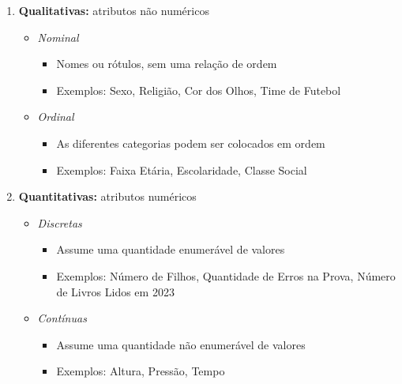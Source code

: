 \documentclass[
]{book}
\providecommand{\tightlist}{%
  \setlength{\itemsep}{0pt}\setlength{\parskip}{0pt}}
\begin{document}
\begin{enumerate}
\def\labelenumi{\arabic{enumi}.}
\tightlist
\item
  \textbf{Qualitativas:} atributos não numéricos

  \begin{itemize}
  \tightlist
  \item
    \emph{Nominal}

    \begin{itemize}
    \tightlist
    \item
      Nomes ou rótulos, sem uma relação de ordem\\
    \item
      Exemplos: Sexo, Religião, Cor dos Olhos, Time de Futebol\\
    \end{itemize}
  \item
    \emph{Ordinal}

    \begin{itemize}
    \tightlist
    \item
      As diferentes categorias podem ser colocados em ordem\\
    \item
      Exemplos: Faixa Etária, Escolaridade, Classe Social
    \end{itemize}
  \end{itemize}
\item
  \textbf{Quantitativas:} atributos numéricos

  \begin{itemize}
  \tightlist
  \item
    \emph{Discretas}

    \begin{itemize}
    \tightlist
    \item
      Assume uma quantidade enumerável de valores\\
    \item
      Exemplos: Número de Filhos, Quantidade de Erros na Prova, Número de Livros Lidos em 2023
    \end{itemize}
  \item
    \emph{Contínuas}

    \begin{itemize}
    \tightlist
    \item
      Assume uma quantidade não enumerável de valores\\
    \item
      Exemplos: Altura, Pressão, Tempo
    \end{itemize}
  \end{itemize}
\end{enumerate}
\end{document}
